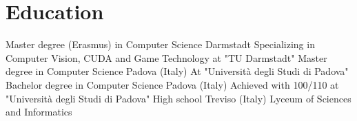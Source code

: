 \documentclass[letterpaper]{twentysecondcv} %
\begin{document}
\section{Education}

\begin{twenty} %
		{Master degree (Erasmus) in Computer Science}	{Darmstadt}
		{Specializing in Computer Vision, CUDA and Game Technology at "TU Darmstadt"\footnotemark[1]}
		{Master degree in Computer Science}	{Padova (Italy)}
		{At "Università degli Studi di Padova"\footnotemark[2]}
		{Bachelor degree in Computer Science}	{Padova (Italy)}
		{Achieved with 100/110 at "Università degli Studi di Padova"\footnotemark[2]}
		{High school}	{Treviso (Italy)}
		{Lyceum of Sciences and Informatics}
\end{twenty}







\end{document}
